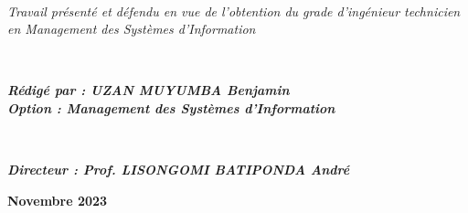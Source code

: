 \begin{titlepage}
	\HRule\\[1.5cm]
	\hfill
	\begin{minipage}{0.6\linewidth}
		\textit{Travail présenté et défendu en vue de l’obtention
		du grade d’ingénieur technicien en Management des
		Systèmes d’Information}\\
	\end{minipage}
	\\
	\hfill
	\begin{minipage}{0.6\textwidth}
		\textit{\textbf{Rédigé par : UZAN MUYUMBA Benjamin}}
		\\
		\textit{\textbf{Option  : Management des Systèmes d’Information}}\\
	\end{minipage}
	\\
	\hfill
	\begin{minipage}{0.6\textwidth}
		\textit{\textbf{Directeur : Prof. LISONGOMI
		BATIPONDA André}}
	\end{minipage}
	
	
	\vfill\vfill\vfill %
	
	\textbf{Novembre 2023}
\end{titlepage}
